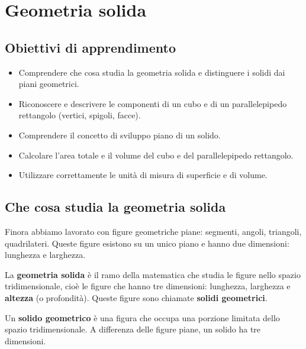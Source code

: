 
\chapter{Geometria solida}

\section*{Obiettivi di apprendimento}
\begin{itemize}[leftmargin=1.4em]
    \item Comprendere che cosa studia la geometria solida e distinguere i solidi dai piani geometrici.
    \item Riconoscere e descrivere le componenti di un cubo e di un parallelepipedo rettangolo (vertici, spigoli, facce).
    \item Comprendere il concetto di sviluppo piano di un solido.
    \item Calcolare l'area totale e il volume del cubo e del parallelepipedo rettangolo.
    \item Utilizzare correttamente le unità di misura di superficie e di volume.
\end{itemize}

\section{Che cosa studia la geometria solida}

Finora abbiamo lavorato con figure geometriche piane: segmenti, angoli, triangoli, quadrilateri. Queste figure esistono su un unico piano e hanno due dimensioni: lunghezza e larghezza.

La \textbf{geometria solida} è il ramo della matematica che studia le figure nello spazio tridimensionale, cioè le figure che hanno tre dimensioni: lunghezza, larghezza e \textbf{altezza} (o profondità). Queste figure sono chiamate \textbf{solidi geometrici}.

\begin{definizione}
    Un \textbf{solido geometrico} è una figura che occupa una porzione limitata dello spazio tridimensionale. A differenza delle figure piane, un solido ha tre dimensioni.
\end{definizione}

